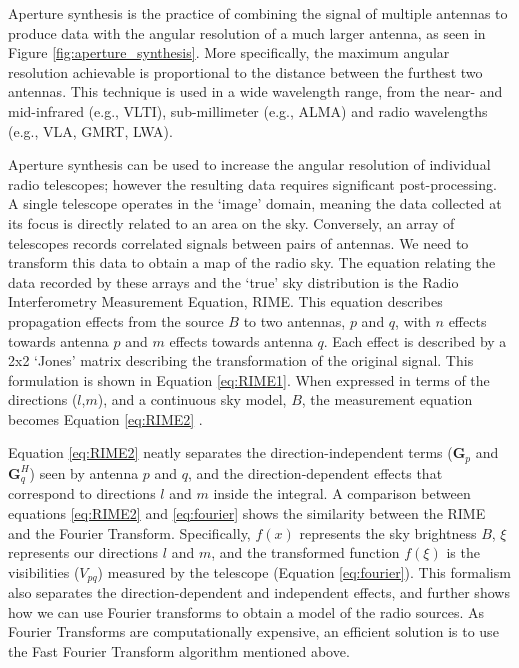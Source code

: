 Aperture synthesis is the practice of combining the signal of multiple antennas to produce data with the angular resolution of a much larger antenna, as seen in Figure \ref{fig:aperture_synthesis}. More specifically, the maximum angular resolution achievable is proportional to the distance between the furthest two antennas. This technique is used in a wide wavelength range, from the near- and mid-infrared (e.g., VLTI), sub-millimeter (e.g., ALMA) and radio wavelengths (e.g., VLA, GMRT, LWA). 

Aperture synthesis can be used to increase the angular resolution of individual radio telescopes; however the resulting data requires significant post-processing. A single telescope operates in the `image' domain, meaning the data collected at its focus is directly related to an area on the sky. Conversely, an array of telescopes records correlated signals between pairs of antennas. We need to transform this data to obtain a map of the radio sky. The equation relating the data recorded by these arrays and the `true' sky distribution is the Radio Interferometry Measurement Equation, RIME. This equation describes propagation effects from the source $B$ to two antennas, $p$ and $q$, with $n$ effects towards antenna $p$ and $m$ effects towards antenna $q$. Each effect is described by a 2x2 `Jones' matrix describing the transformation of the original signal. This formulation is shown in Equation \ref{eq:RIME1}. When expressed in terms of the directions ($l$,$m$), and a continuous sky model, $B$, the measurement equation becomes Equation \ref{eq:RIME2}\citep{thompson1986interferometry} .

Equation \ref{eq:RIME2} neatly separates the direction-independent terms ($\bm{G}_p$ and $\bm{G}^H_q$) seen by antenna $p$ and $q$, and the direction-dependent effects that correspond to directions $l$ and $m$ inside the integral. A comparison between equations \ref{eq:RIME2} and \ref{eq:fourier} shows the similarity between the RIME and the Fourier Transform. Specifically, $f(x)$ represents the sky brightness $B$, $\xi$ represents our directions $l$ and $m$, and the transformed function $f(\xi)$ is the visibilities ($V_{pq}$) measured by the telescope (Equation \ref{eq:fourier}). This formalism also separates the direction-dependent and independent effects, and further shows how we can use Fourier transforms to obtain a model of the radio sources. As Fourier Transforms are computationally expensive, an efficient solution is to use the Fast Fourier Transform algorithm mentioned above. 

